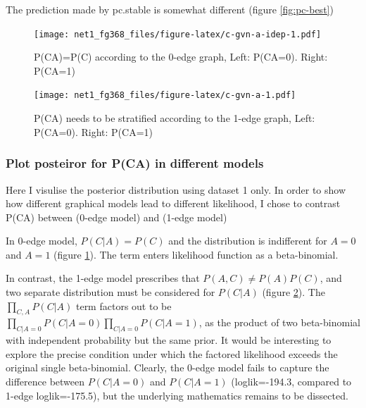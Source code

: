 \documentclass[]{article}
\theoremstyle{definition}
\theoremstyle{definition}
\theoremstyle{definition}
\theoremstyle{remark}
\begin{document}
The prediction made by pc.stable is somewhat different (figure
\ref{fig:pc-best})

\begin{figure}
\centering
\texttt{[image: net1\_fg368\_files/figure-latex/c-gvn-a-idep-1.pdf]}
\caption{\label{fig:c-gvn-a-idep}P(C\textbar{}A)=P(C) according to the
0-edge graph, Left: P(C\textbar{}A=0). Right: P(C\textbar{}A=1)}
\end{figure}

\begin{figure}
\centering
\texttt{[image: net1\_fg368\_files/figure-latex/c-gvn-a-1.pdf]}
\caption{\label{fig:c-gvn-a}P(C\textbar{}A) needs to be stratified according
to the 1-edge graph, Left: P(C\textbar{}A=0). Right: P(C\textbar{}A=1)}
\end{figure}

\subsubsection{Plot posteiror for P(C\textbar{}A) in different
models}\label{plot-posteiror-for-pca-in-different-models}

Here I visulise the posterior distribution using dataset 1 only. In
order to show how different graphical models lead to different
likelihood, I chose to contrast P(C\textbar{}A) between
\text{[A][B][C]}(0-edge model) and \text{[A][B][C|A]} (1-edge model)

In 0-edge model, \(P(C|A)=P(C)\) and the distribution is indifferent for
\(A=0\) and \(A=1\) (figure \ref{fig:c-gvn-a-idep}). The term enters
likelihood function as a beta-binomial.

In contrast, the 1-edge model prescribes that \(P(A,C)\neq P(A)P(C)\),
and two separate distribution must be considered for \(P(C|A)\) (figure
\ref{fig:c-gvn-a}). The \(\prod_{C,A} P(C|A)\) term factors out to be
\(\prod_{C|A=0} P(C|A=0)\prod_{C|A=0} P(C|A=1)\), as the product of two
beta-binomial with independent probability but the same prior. It would
be interesting to explore the precise condition under which the factored
likelihood exceeds the original single beta-binomial. Clearly, the
0-edge model fails to capture the difference between \(P(C|A=0)\) and
\(P(C|A=1)\) (loglik=-194.3, compared to 1-edge loglik=-175.5), but the
underlying mathematics remains to be dissected.
\end{document}
